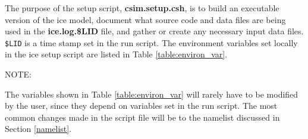 

The purpose of the setup script, {\bf csim.setup.csh}, is to build an
executable version of the ice model, document what source code and data
files are being used in the {\bf ice.log.\$LID} file, and gather or create
any necessary input data files. {\tt \$LID} is a time stamp set in the run script.
The environment variables set locally in the ice setup script are listed
in Table \ref{table:environ_var}.

\begin{Ventry}{NOTE:}
\item[NOTE]
The variables shown in Table \ref{table:environ_var} will rarely have to
be modified by the user, since they depend on variables set in the run
script.  The most common changes made in the script file will be to the
namelist discussed in Section \ref{namelist}.

\end{Ventry}

